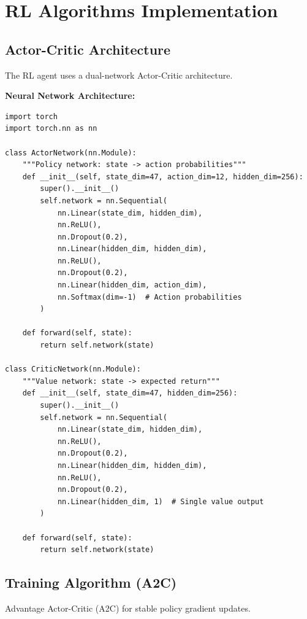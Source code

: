 \section{RL Algorithms Implementation}

\subsection{Actor-Critic Architecture}

The RL agent uses a dual-network Actor-Critic architecture.

\textbf{Neural Network Architecture:}
\begin{lstlisting}[style=pythonstyle]
import torch
import torch.nn as nn

class ActorNetwork(nn.Module):
    """Policy network: state -> action probabilities"""
    def __init__(self, state_dim=47, action_dim=12, hidden_dim=256):
        super().__init__()
        self.network = nn.Sequential(
            nn.Linear(state_dim, hidden_dim),
            nn.ReLU(),
            nn.Dropout(0.2),
            nn.Linear(hidden_dim, hidden_dim),
            nn.ReLU(),
            nn.Dropout(0.2),
            nn.Linear(hidden_dim, action_dim),
            nn.Softmax(dim=-1)  # Action probabilities
        )
    
    def forward(self, state):
        return self.network(state)

class CriticNetwork(nn.Module):
    """Value network: state -> expected return"""
    def __init__(self, state_dim=47, hidden_dim=256):
        super().__init__()
        self.network = nn.Sequential(
            nn.Linear(state_dim, hidden_dim),
            nn.ReLU(),
            nn.Dropout(0.2),
            nn.Linear(hidden_dim, hidden_dim),
            nn.ReLU(),
            nn.Dropout(0.2),
            nn.Linear(hidden_dim, 1)  # Single value output
        )
    
    def forward(self, state):
        return self.network(state)
\end{lstlisting}

\subsection{Training Algorithm (A2C)}

Advantage Actor-Critic (A2C) for stable policy gradient updates.

